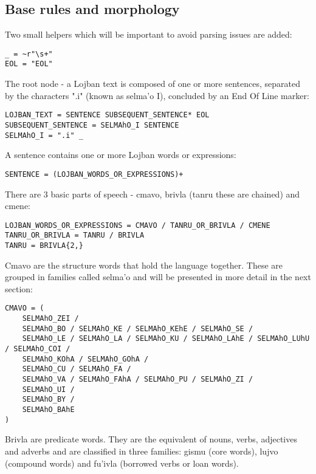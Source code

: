 \subsection{Base rules and morphology}

Two small helpers which will be important to avoid parsing issues are added:

\begin{lstlisting}[caption=PEG helpers]
_ = ~r"\s+"
EOL = "EOL"
\end{lstlisting}

The root node - a Lojban text is composed of one or more sentences, separated by the characters ".i" (known as selma'o I), concluded by an End Of Line marker:

\begin{lstlisting}[caption=PEG rules for Lojban text]
LOJBAN_TEXT = SENTENCE SUBSEQUENT_SENTENCE* EOL
SUBSEQUENT_SENTENCE = SELMAhO_I SENTENCE
SELMAhO_I = ".i" _
\end{lstlisting}

A sentence contains one or more Lojban words or expressions:

\begin{lstlisting}[caption=PEG rules for Lojban sentences]
SENTENCE = (LOJBAN_WORDS_OR_EXPRESSIONS)+
\end{lstlisting}

There are 3 basic parts of speech - cmavo, brivla (tanru these are chained) and cmene:

\begin{lstlisting}[caption=PEG rules for basic parts of speech]
LOJBAN_WORDS_OR_EXPRESSIONS = CMAVO / TANRU_OR_BRIVLA / CMENE
TANRU_OR_BRIVLA = TANRU / BRIVLA
TANRU = BRIVLA{2,}
\end{lstlisting}

Cmavo are the structure words that hold the language together. These are grouped in families called selma'o and
will be presented in more detail in the next section:

\begin{lstlisting}[caption=CMAVO rule]
CMAVO = (
    SELMAhO_ZEI /
    SELMAhO_BO / SELMAhO_KE / SELMAhO_KEhE / SELMAhO_SE /
    SELMAhO_LE / SELMAhO_LA / SELMAhO_KU / SELMAhO_LAhE / SELMAhO_LUhU / SELMAhO_COI /
    SELMAhO_KOhA / SELMAhO_GOhA /
    SELMAhO_CU / SELMAhO_FA /
    SELMAhO_VA / SELMAhO_FAhA / SELMAhO_PU / SELMAhO_ZI /
    SELMAhO_UI /
    SELMAhO_BY /
    SELMAhO_BAhE
)
\end{lstlisting}

Brivla are predicate words. They are the equivalent of nouns, verbs, adjectives and adverbs and are classified in three families:
gismu (core words), lujvo (compound words) and fu'ivla (borrowed verbs or loan words).\newline


